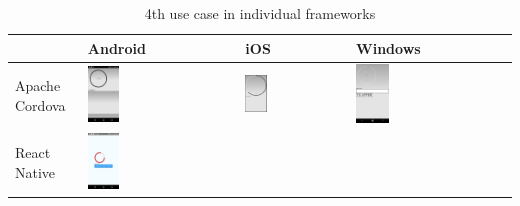 \documentclass[english,master,public,dept460,male,cpdeclaration,oneside]{diploma}
\begin{document}
\begin{table}[!h]
	\centering
	\caption{4th use case in individual frameworks}
	\label{table:uis}
	\begin{tabular}{p{3cm} | p{4cm} | p{4cm} | p{4cm} }
		\toprule			
		& Android & iOS & Windows \\
		\midrule
		Apache Cordova	
		& \includegraphics[width=0.22\textwidth]{Figures/cordova4android.PNG}
		& \includegraphics[width=0.22\textwidth]{Figures/cordova4ios.png}
		& \includegraphics[width=0.22\textwidth]{Figures/cordova4windows.PNG}
		\\
		\midrule
		React Native	
		& \includegraphics[width=0.22\textwidth]{Figures/react4android.PNG}

\end{tabular}
\end{table}
\end{document}
